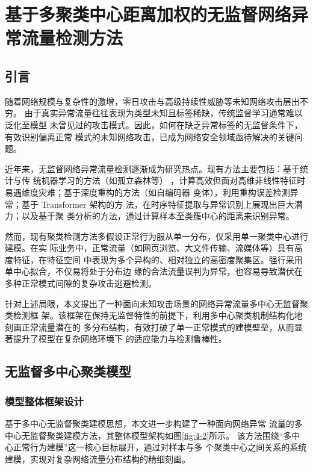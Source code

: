 \chapter{基于多聚类中心距离加权的无监督网络异常流量检测方法}
\section{引言}
随着网络规模与复杂性的激增，零日攻击与高级持续性威胁等未知网络攻击层出不穷。
由于真实异常流量往往表现为类型未知且标签稀缺，传统监督学习通常难以泛化至模型
未曾见过的攻击模式。因此，如何在缺乏异常标签的无监督条件下，有效识别偏离正常
模式的未知网络攻击，已成为网络安全领域亟待解决的关键问题。

近年来，无监督网络异常流量检测逐渐成为研究热点。现有方法主要包括：基于统计与传
统机器学习的方法（如孤立森林等\cite{saremi2025unsupervised, bountzis2025deep}）
，计算高效但面对高维非线性特征时易遇维度灾难；基于深度重构的方法（如自编码器
变体\cite{mienye2025deep}），利用重构误差检测异常；基于 Transformer 架构的方
法\cite{chen2024abnormal}，在时序特征提取与异常识别上展现出巨大潜力；以及基于聚
类分析的方法，通过计算样本至类簇中心的距离来识别异常。

然而，现有聚类检测方法多假设正常行为服从单一分布，仅采用单一聚类中心进行建模。在实
际业务中，正常流量（如网页浏览、大文件传输、流媒体等）具有高度特征，在特征空间
中表现为多个异构的、相对独立的高密度聚集区。强行采用单中心拟合，不仅易将处于分布边
缘的合法流量误判为异常，也容易导致潜伏在多种正常模式间隙的复杂攻击逃避检测。

针对上述局限，本文提出了一种面向未知攻击场景的网络异常流量多中心无监督聚类检测框
架。该框架在保持无监督特性的前提下，利用多中心聚类机制结构化地刻画正常流量潜在的
多分布结构，有效打破了单一正常模式的建模壁垒，从而显著提升了模型在复杂网络环境下
的适应能力与检测鲁棒性。

\section{无监督多中心聚类模型}
\subsection{模型整体框架设计}
基于多中心无监督聚类建模思想，本文进一步构建了一种面向网络异常
流量的多中心无监督聚类建模方法，其整体模型架构如图\ref{fig:4-2}所示。
该方法围绕“多中心正常行为建模”这一核心目标展开，通过对样本与多
个聚类中心之间关系的系统建模，实现对复杂网络流量分布结构的精细刻画。

